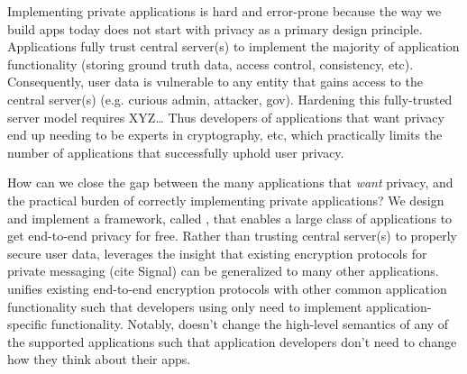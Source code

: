 Implementing private applications is hard and error-prone because the way we 
build apps today does not start with privacy as a primary design principle.
Applications fully trust central server(s) to implement the majority of application 
functionality (storing ground truth data, access control, consistency, etc).
Consequently, user data is vulnerable to any entity that gains access to the 
central server(s) (e.g. curious admin, attacker, gov).
Hardening this fully-trusted server model requires XYZ\dots
Thus developers of applications that want privacy end up needing to be experts 
in cryptography, etc, which practically limits the number of applications that 
successfully uphold user privacy.



How can we close the gap between the many applications that \textit{want} privacy, 
and the practical burden of correctly implementing private applications?
We design and implement a framework, called \name, that enables a large class of 
applications to get end-to-end privacy for free.
Rather than trusting central server(s) to properly secure user data, \name leverages 
the insight that existing encryption protocols for private messaging (cite Signal) 
can be generalized to many other applications.
\name unifies existing end-to-end encryption protocols with other common application 
functionality such that developers using \name only need to implement application-
specific functionality.
Notably, \name doesn't change the high-level semantics of any of the supported 
applications such that application developers don't need to change how they think 
about their apps. 

